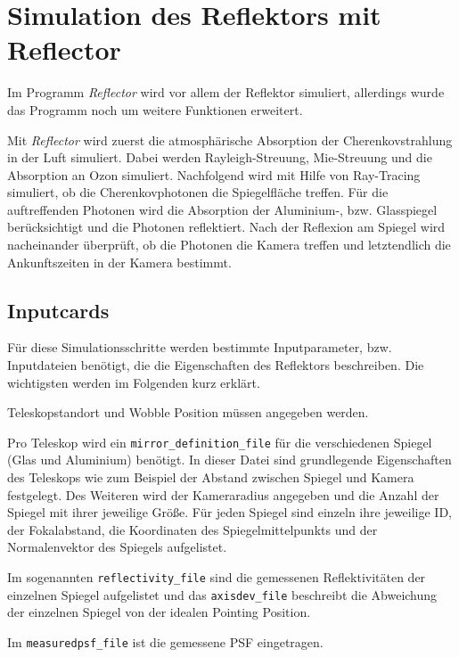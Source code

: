 \section{Simulation des Reflektors mit Reflector}
\label{sec:Reflector}
Im Programm \textit{Reflector}\cite{Reflector} wird vor allem der Reflektor simuliert, allerdings wurde das Programm noch um weitere Funktionen erweitert.

Mit \textit{Reflector} wird zuerst die atmosphärische Absorption der Cherenkovstrahlung in der Luft simuliert. 
Dabei werden Rayleigh-Streuung, Mie-Streuung und die Absorption an Ozon simuliert.
Nachfolgend wird mit Hilfe von Ray-Tracing simuliert, ob die Cherenkovphotonen die Spiegelfläche treffen.
Für die auftreffenden Photonen wird die Absorption der Aluminium-, bzw. Glasspiegel berücksichtigt und die Photonen reflektiert.
Nach der Reflexion am Spiegel wird nacheinander überprüft, ob die Photonen die Kamera treffen und letztendlich die Ankunftszeiten in der Kamera bestimmt.

\subsection{Inputcards}
Für diese Simulationsschritte werden bestimmte Inputparameter, bzw. Inputdateien benötigt, die die Eigenschaften des Reflektors beschreiben.
Die wichtigsten werden im Folgenden kurz erklärt.


Teleskopstandort und Wobble Position müssen angegeben werden.

Pro Teleskop wird ein \texttt{mirror\_definition\_file} für die verschiedenen Spiegel (Glas und Aluminium) benötigt.
In dieser Datei sind grundlegende Eigenschaften des Teleskops wie zum Beispiel der Abstand zwischen Spiegel und Kamera festgelegt. 
Des Weiteren wird der Kameraradius angegeben und die Anzahl der Spiegel mit ihrer jeweilige Größe.
Für jeden Spiegel sind einzeln ihre jeweilige ID, der Fokalabstand, die Koordinaten des Spiegelmittelpunkts und der Normalenvektor des Spiegels aufgelistet.

Im sogenannten \texttt{reflectivity\_file} sind die gemessenen Reflektivitäten der einzelnen Spiegel aufgelistet und das \texttt{axisdev\_file} beschreibt die Abweichung der einzelnen Spiegel von der idealen Pointing Position.

Im \texttt{measuredpsf\_file} ist die gemessene PSF eingetragen.

